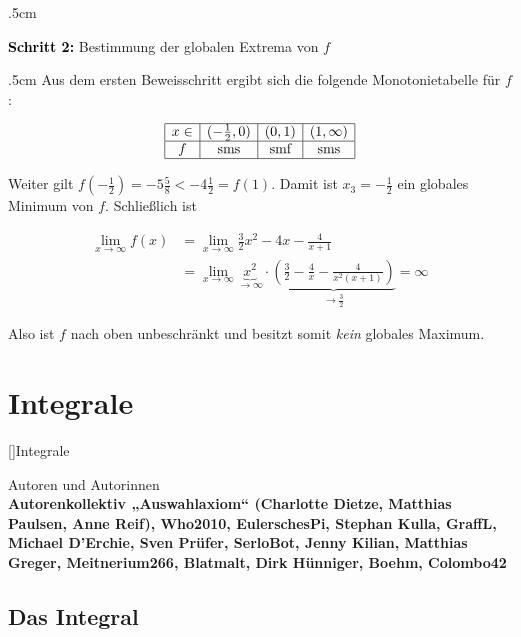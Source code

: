 \documentclass[fontsize=9pt,
               parskip=half-,
               DIV=14,
               listof=chapterentry,
               tocflat]{scrbook}
\newenvironment{indentblock}{\begin{adjustwidth}{.5cm}{}}{\end{adjustwidth}}
\newenvironment{authors}{\par\vspace*{\fill}\color{white}Autoren und
Autorinnen\\\bfseries}{\clearpage}
\newcommand{\proofstep}[1]{\textbf{\textcolor{Black}{#1}}}
\begin{document}
\begin{solution*}
\begin{indentblock}
\end{indentblock}

\proofstep{Schritt 2:}
 Bestimmung der globalen Extrema von $f$\begin{indentblock}
Aus dem ersten Beweisschritt ergibt sich die folgende Monotonietabelle für $f$:

\begin{align*}
{\begin{array}{|c|c|c|c|}\hline x\in &(-{\tfrac {1}{2}},0)&(0,1)&(1,\infty )\\\hline f&{\text{sms}}&{\text{smf}}&{\text{sms}}\\\hline \end{array}}
\end{align*}

Weiter gilt $f(-{\tfrac {1}{2}})=-5{\tfrac {5}{8}}<-4{\tfrac {1}{2}}=f(1)$. Damit ist $x_{3}=-{\tfrac {1}{2}}$ ein globales Minimum von $f$. Schließlich ist

\begin{align*}
\lim _{x\to \infty }f(x)&=\lim _{x\to \infty }{\tfrac {3}{2}}x^{2}-4x-{\tfrac {4}{x+1}}\\[0.3em]&=\lim _{x\to \infty }\underbrace {x^{2}} _{\to \infty }\cdot \underbrace {\left({\tfrac {3}{2}}-{\tfrac {4}{x}}-{\tfrac {4}{x^{2}(x+1)}}\right)} _{\to {\tfrac {3}{2}}}=\infty 
\end{align*}

Also ist $f$ nach oben unbeschränkt und besitzt somit \emph{kein} globales Maximum.

\end{indentblock}

\end{solution*}

\part{Integrale}

[]{Integrale}\begin{authors}
Autorenkollektiv „Auswahlaxiom“ (Charlotte Dietze, Matthias Paulsen, Anne Reif), Who2010, EulerschesPi, Stephan Kulla, GraffL, Michael D'Erchie, Sven Prüfer, SerloBot, Jenny Kilian, Matthias Greger, Meitnerium266, Blatmalt, Dirk Hünniger, Boehm, Colombo42\end{authors}

\chapter{Das Integral}
\end{document}
